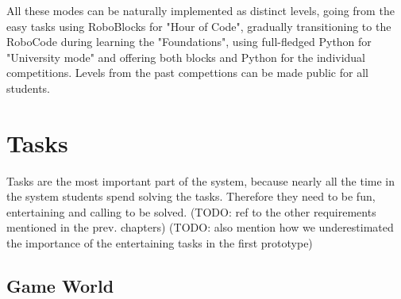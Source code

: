 All these modes can be naturally implemented as distinct levels,
going from the easy tasks using RoboBlocks for "Hour of Code",
gradually transitioning to the RoboCode during learning the "Foundations",
using full-fledged Python for "University mode"
and offering both blocks and Python for the individual competitions.
Levels from the past compettions can be made public for all students.


\section{Tasks}
\label{sec:robomission.tasks}

Tasks are the most important part of the system,
because nearly all the time in the system students spend solving the tasks.
Therefore they need to be fun, entertaining and calling to be solved.
(TODO: ref to the other requirements mentioned in the prev. chapters)
(TODO: also mention how we underestimated the importance of the entertaining tasks in the first prototype)

\subsection{Game World}
\label{sec:robomission.game-world}


